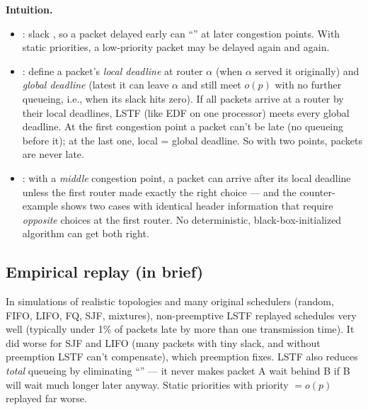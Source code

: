 \textbf{Intuition.}
\begin{itemize}
\item {}: slack , so a packet delayed early can ``'' at later congestion points. With static priorities, a low-priority packet may be delayed again and again.
\item {}: define a packet's \emph{local deadline} at router $\alpha$ (when $\alpha$ served it originally) and \emph{global deadline} (latest it can leave $\alpha$ and still meet $o(p)$ with no further queueing, i.e., when its slack hits zero). If all packets arrive at a router by their local deadlines, LSTF (like EDF on one processor) meets every global deadline. At the first congestion point a packet can't be late (no queueing before it); at the last one, local = global deadline. So with two points, packets are never late.
\item {}: with a \emph{middle} congestion point, a packet can arrive after its local deadline unless the first router made exactly the right choice --- and the counter-example shows two cases with identical header information that require \emph{opposite} choices at the first router. No deterministic, black-box-initialized algorithm can get both right.
\end{itemize}

\subsection{Empirical replay (in brief)}
In simulations of realistic topologies and many original schedulers (random, FIFO, LIFO, FQ, SJF, mixtures), non-preemptive LSTF replayed schedules very well (typically under 1\% of packets late by more than one transmission time). It did worse for SJF and LIFO (many packets with tiny slack, and without preemption LSTF can't compensate), which preemption fixes. LSTF also reduces \emph{total} queueing by eliminating ``'' --- it never makes packet A wait behind B if B will wait much longer later anyway. Static priorities with priority $=o(p)$ replayed far worse.

